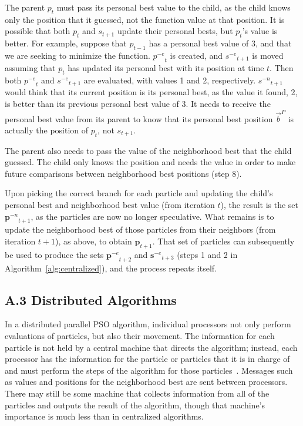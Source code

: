 \documentclass[smallcondensed]{svjour3}
\newcommand{\alg}[1]{Algorithm~\ref{alg:#1}}
\providecommand{\pers}{\ensuremath{P}}
\providecommand{\pbest}{\ensuremath{\Vec{b}^\pers}}
\providecommand{\noeval}[1]{\ensuremath{#1^{-e}}}
\providecommand{\nonbest}[1]{\ensuremath{#1^{-n}}}
\providecommand{\p}{\ensuremath{p}}
\providecommand{\pset}{\ensuremath{\mathbf{p}}}
\providecommand{\s}{\ensuremath{s}}
\providecommand{\sset}{\ensuremath{\mathbf{s}}}
\begin{document}
The parent $\p_t$ must pass its personal best value to the child, as the child
knows only the position that it guessed, not the function value at that
position.  It is possible that both $\p_t$ and $\s_{t+1}$ update their personal
bests, but $\p_t$'s value is better.  For example, suppose that $\p_{t-1}$ has
a personal best value of 3, and that we are seeking to minimize the function.
$\noeval{\p}_t$ is created, and $\noeval{\s}_{t+1}$ is moved assuming that
$\p_t$ has updated its personal best with its position at time $t$.  Then both
$\noeval{\p}_t$ and $\noeval{\s}_{t+1}$ are evaluated, with values 1 and 2,
respectively.  $\nonbest{\s}_{t+1}$ would think that its current position is
its personal best, as the value it found, 2, is better than its previous
personal best value of 3.  It needs to receive the personal best value from its
parent to know that its personal best position $\pbest$ is actually the
position of $\p_t$, not $\s_{t+1}$.

The parent also needs to pass the value of the neighborhood best that the child
guessed.  The child only knows the position and needs the value in order to
make future comparisons between neighborhood best positions (step 8).

Upon picking the correct branch for each particle and updating the child's
personal best and neighborhood best value (from iteration $t$), the result is
the set $\nonbest{\pset}_{t+1}$, as the particles are now no longer
speculative.  What remains is to update the neighborhood best of those
particles from their neighbors (from iteration $t+1$), as above, to obtain
$\pset_{t+1}$.  That set of particles can subsequently be used to produce the
sets $\noeval{\pset}_{t+2}$ and $\noeval{\sset}_{t+3}$ (steps 1 and 2 in
\alg{centralized}), and the process repeats itself.

\subsection*{A.3 Distributed Algorithms}

\label{sec:distributed}

In a distributed parallel PSO algorithm, individual processors not only perform
evaluations of particles, but also their movement.  The information for each
particle is not held by a central machine that directs the algorithm; instead,
each processor has the information for the particle or particles that it is in
charge of and must perform the steps of the algorithm for those
particles~\citep{mcnabb-2007-parallel-pso-using-mapreduce}.  Messages such as
values and positions for the neighborhood best are sent between processors.
There may still be some machine that collects information from all of the
particles and outputs the result of the algorithm, though that machine's
importance is much less than in centralized algorithms.
\end{document}
